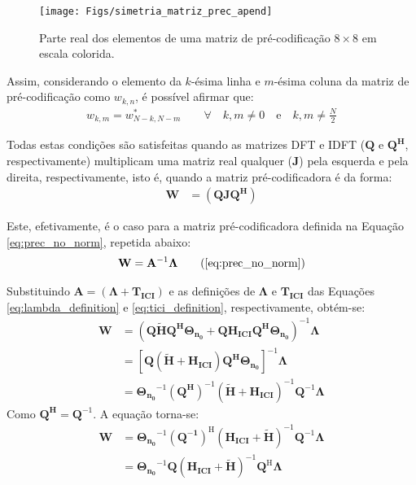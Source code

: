\begin{figure}[htbp]
\centering
\texttt{[image: Figs/simetria\_matriz\_prec\_apend]}
\caption{ Parte real dos elementos de uma matriz de pré-codificação $8 \times 8$ em escala colorida.  \label{fig:simetria_matriz_prec_apend}}
\end{figure}

Assim, considerando o elemento da $k$-ésima linha e $m$-ésima coluna da matriz de pré-codificação como $w_{k,n}$, é possível afirmar que:
\begin{align}
w_{k,m} = w^*_{N-k, N-m} \quad \quad \forall \quad k,m  \neq 0 \quad \text{e} \quad k,m  \neq \frac{N}{2}
\end{align}

Todas estas condições são satisfeitas quando as matrizes DFT e IDFT ($\mathbf{Q}$ e $\mathbf{Q^H}$, respectivamente) multiplicam uma matriz real qualquer ($\mathbf{J}$) pela esquerda e pela direita, respectivamente, isto é, quando a matriz pré-codificadora é da forma:
\begin{align}
\mathbf{W} &= \mathbf{\left(Q J Q^{\text{H}}\right)}
\label{eq:cond_matriz_prec}
\end{align}

Este, efetivamente, é o caso para a matriz pré-codificadora definida na Equação \ref{eq:prec_no_norm}, repetida abaixo:
\begin{align}
\mathbf{W} =  \mathbf{A}^{-1}\mathbf{\Lambda}
\tag{\ref{eq:prec_no_norm}}
\end{align}

Substituindo $\mathbf{A} = \left( \mathbf{\Lambda} + \mathbf{ T_\text{ICI}} \right)$ e as definições de $\mathbf{\Lambda}$ e $\mathbf{T_\text{ICI}}$ das Equações \ref{eq:lambda_definition} e \ref{eq:tici_definition}, respectivamente, obtém-se:
\begin{align}
\mathbf{W} &=  \mathbf{ \left( Q\tilde{\mathbf{H}}Q^H\mathbf{\Theta}_{n_0} + Q \mathbf{ H_\text{ICI}} Q^\text{H} \mathbf{\Theta_{n_0}} \right)}^{-1}\mathbf{\Lambda} \nonumber\\
&= \mathbf{ \left[ Q \left( \mathbf{ \tilde{\mathbf{H}} + H_\text{ICI}} \right)Q^\text{H} \mathbf{\Theta_{n_0}} \right]}^{-1}\mathbf{\Lambda} \nonumber\\
&= \mathbf{\Theta_{n_0}}^{-1} \left(\mathbf{Q^H}\right)^{-1} \left( \tilde{\mathbf{H}} + \mathbf{ H_\text{ICI}} \right)^{-1} \mathbf{Q}^{-1} \mathbf{\Lambda} \nonumber
\end{align}
Como $\mathbf{Q^{H}} = \mathbf{Q}^{-1}$. A equação torna-se:
\begin{align}
\mathbf{W} &= \mathbf{\Theta_{n_0}}^{-1} \left(\mathbf{Q^{-1}}\right)^{\text{H}} \left( \mathbf{ H_\text{ICI}} + \tilde{\mathbf{H}} \right)^{-1} \mathbf{Q}^{-1} \mathbf{\Lambda} \nonumber\\
&= \mathbf{\Theta_{n_0}}^{-1} \mathbf{Q} \left( \mathbf{ H_\text{ICI}} + \tilde{\mathbf{H}} \right)^{-1} \mathbf{Q}^{\text{H}} \mathbf{\Lambda} \nonumber
\end{align}

